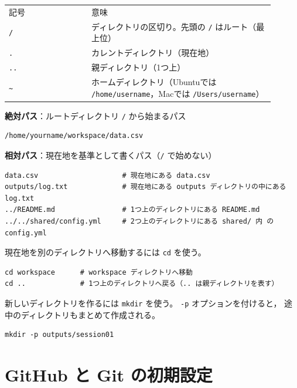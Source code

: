 \begin{center}
\begin{tabular}{p{0.28\linewidth}p{0.62\linewidth}}
\hline
記号 & 意味 \\
\texttt{/} & ディレクトリの区切り。先頭の \texttt{/} はルート（最上位） \\
\texttt{.} & カレントディレクトリ（現在地） \\
\texttt{..} & 親ディレクトリ（1つ上） \\
\texttt{\textasciitilde{}} & ホームディレクトリ（Ubuntuでは \texttt{/home/username}，Macでは \texttt{/Users/username}） \\
\hline
\end{tabular}
\end{center}

\textbf{絶対パス}：ルートディレクトリ \texttt{/} から始まるパス

\begin{lstlisting}[style=codecell]
/home/yourname/workspace/data.csv
\end{lstlisting}

\textbf{相対パス}：現在地を基準として書くパス（\texttt{/} で始めない）

\begin{lstlisting}[style=codecell]
data.csv                    # 現在地にある data.csv
outputs/log.txt             # 現在地にある outputs ディレクトリの中にある log.txt
../README.md                # 1つ上のディレクトリにある README.md
../../shared/config.yml     # 2つ上のディレクトリにある shared/ 内 の config.yml
\end{lstlisting}

現在地を別のディレクトリへ移動するには \texttt{cd} を使う。

\begin{lstlisting}[style=codecell]
cd workspace      # workspace ディレクトリへ移動
cd ..             # 1つ上のディレクトリへ戻る（.. は親ディレクトリを表す）
\end{lstlisting}

新しいディレクトリを作るには \texttt{mkdir} を使う。
\texttt{-p} オプションを付けると，
途中のディレクトリもまとめて作成される。

\begin{lstlisting}[style=codecell]
mkdir -p outputs/session01
\end{lstlisting}

\section{GitHub と Git の初期設定}

